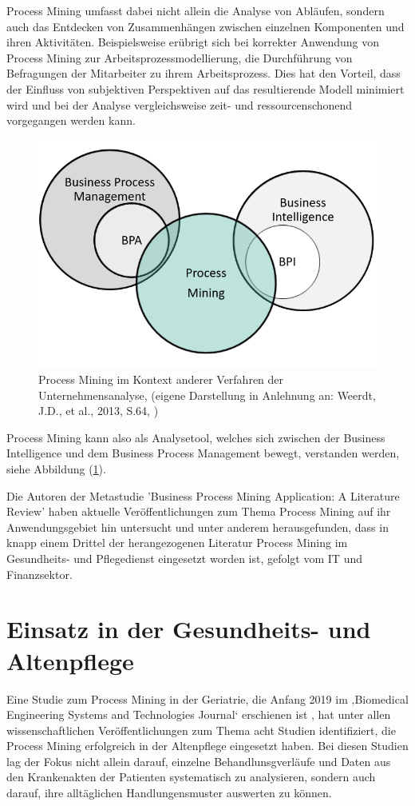 Process Mining umfasst dabei nicht allein die Analyse von Abläufen, sondern auch das Entdecken von Zusammenhängen zwischen einzelnen Komponenten und ihren Aktivitäten. Beispielsweise erübrigt sich bei korrekter Anwendung von Process Mining zur Arbeitsprozessmodellierung, die Durchführung von Befragungen der Mitarbeiter zu ihrem Arbeitsprozess. Dies hat den Vorteil, dass der Einfluss von subjektiven Perspektiven auf das resultierende Modell minimiert wird und bei der Analyse vergleichsweise zeit- und ressourcenschonend vorgegangen werden kann.
\begin{figure}[!ht]
    \centering
    \includegraphics[scale=0.41]{figures/Appbildungen/businessanalytics.PNG}
    \caption{Process Mining im Kontext anderer Verfahren der Unternehmensanalyse,  (eigene Darstellung in Anlehnung an: Weerdt, J.D., et al., 2013, S.64, \cite{DeWeerdt})}
    \label{fig:BIContext}
\end{figure}

Process Mining kann also als Analysetool, welches sich zwischen der Business Intelligence und dem Business Process Management bewegt, verstanden werden, siehe Abbildung (\ref{fig:BIContext}).

Die Autoren der Metastudie 'Business Process Mining Application: A Literature Review' \cite{litreview} haben aktuelle Veröffentlichungen zum Thema Process Mining auf ihr Anwendungsgebiet hin untersucht und unter anderem herausgefunden, dass in knapp einem Drittel der herangezogenen Literatur Process Mining im Gesundheits- und Pflegedienst eingesetzt worden ist, gefolgt vom IT und Finanzsektor.

\section{Einsatz in der Gesundheits- und Altenpflege}
Eine Studie zum Process Mining in der Geriatrie, die Anfang 2019 im ‚Biomedical Engineering Systems and Technologies Journal‘ erschienen ist \cite{wrro141683}, hat unter allen wissenschaftlichen Veröffentlichungen zum Thema acht Studien identifiziert, die Process Mining erfolgreich in der Altenpflege eingesetzt haben. Bei diesen Studien lag der Fokus nicht allein darauf, einzelne Behandlunsgverläufe und Daten aus den Krankenakten der Patienten systematisch zu analysieren, sondern auch darauf, ihre alltäglichen Handlungensmuster auswerten zu können. 

